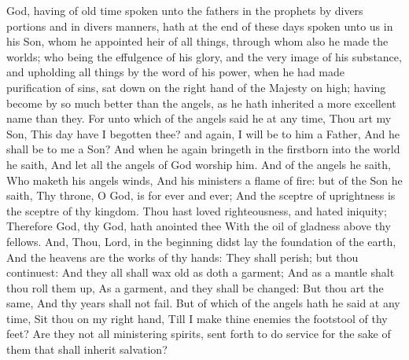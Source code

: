 


God, having of old time spoken unto the fathers in the prophets by divers portions and in divers manners, hath at the end of these days spoken unto us in his Son, whom he appointed heir of all things, through whom also he made the worlds; who being the effulgence of his glory, and the very image of his substance, and upholding all things by the word of his power, when he had made purification of sins, sat down on the right hand of the Majesty on high; having become by so much better than the angels, as he hath inherited a more excellent name than they. For unto which of the angels said he at any time, Thou art my Son, This day have I begotten thee? and again, I will be to him a Father, And he shall be to me a Son?  And when he again bringeth in the firstborn into the world he saith, And let all the angels of God worship him. And of the angels he saith, Who maketh his angels winds, And his ministers a flame of fire:  but of the Son he saith, Thy throne, O God, is for ever and ever; And the sceptre of uprightness is the sceptre of thy kingdom.  Thou hast loved righteousness, and hated iniquity; Therefore God, thy God, hath anointed thee With the oil of gladness above thy fellows.  And, Thou, Lord, in the beginning didst lay the foundation of the earth, And the heavens are the works of thy hands:  They shall perish; but thou continuest: And they all shall wax old as doth a garment;  And as a mantle shalt thou roll them up, As a garment, and they shall be changed: But thou art the same, And thy years shall not fail.  But of which of the angels hath he said at any time, Sit thou on my right hand, Till I make thine enemies the footstool of thy feet?  Are they not all ministering spirits, sent forth to do service for the sake of them that shall inherit salvation? 

